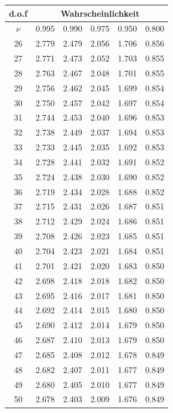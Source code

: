 \hspace{7mm}
\begin{tabular}{c||c|c|c|c|c|}
d.o.f & \multicolumn{5}{c|}{Wahrscheinlichkeit}\\
\hline
$\nu$ & 0.995 & 0.990 & 0.975 & 0.950 & 0.800 \\ 
\hline\hline
26 & 2.779 & 2.479 & 2.056 & 1.706 & 0.856 \\ 
\hline
27 & 2.771 & 2.473 & 2.052 & 1.703 & 0.855 \\ 
\hline
28 & 2.763 & 2.467 & 2.048 & 1.701 & 0.855 \\ 
\hline
29 & 2.756 & 2.462 & 2.045 & 1.699 & 0.854 \\ 
\hline
30 & 2.750 & 2.457 & 2.042 & 1.697 & 0.854 \\ 
\hline
31 & 2.744 & 2.453 & 2.040 & 1.696 & 0.853 \\ 
\hline
32 & 2.738 & 2.449 & 2.037 & 1.694 & 0.853 \\ 
\hline
33 & 2.733 & 2.445 & 2.035 & 1.692 & 0.853 \\ 
\hline
34 & 2.728 & 2.441 & 2.032 & 1.691 & 0.852 \\ 
\hline
35 & 2.724 & 2.438 & 2.030 & 1.690 & 0.852 \\ 
\hline
36 & 2.719 & 2.434 & 2.028 & 1.688 & 0.852 \\ 
\hline
37 & 2.715 & 2.431 & 2.026 & 1.687 & 0.851 \\ 
\hline
38 & 2.712 & 2.429 & 2.024 & 1.686 & 0.851 \\ 
\hline
39 & 2.708 & 2.426 & 2.023 & 1.685 & 0.851 \\ 
\hline
40 & 2.704 & 2.423 & 2.021 & 1.684 & 0.851 \\ 
\hline
41 & 2.701 & 2.421 & 2.020 & 1.683 & 0.850 \\ 
\hline
42 & 2.698 & 2.418 & 2.018 & 1.682 & 0.850 \\ 
\hline
43 & 2.695 & 2.416 & 2.017 & 1.681 & 0.850 \\ 
\hline
44 & 2.692 & 2.414 & 2.015 & 1.680 & 0.850 \\ 
\hline
45 & 2.690 & 2.412 & 2.014 & 1.679 & 0.850 \\ 
\hline
46 & 2.687 & 2.410 & 2.013 & 1.679 & 0.850 \\ 
\hline
47 & 2.685 & 2.408 & 2.012 & 1.678 & 0.849 \\ 
\hline
48 & 2.682 & 2.407 & 2.011 & 1.677 & 0.849 \\ 
\hline
49 & 2.680 & 2.405 & 2.010 & 1.677 & 0.849 \\ 
\hline
50 & 2.678 & 2.403 & 2.009 & 1.676 & 0.849 \\ 
\hline
\end{tabular}


